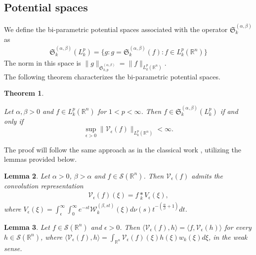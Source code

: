 \documentclass[11pt,a4paper,reqno]{amsproc}
\newtheorem{theorem}{Theorem}[section]
\newtheorem{lemma}[theorem]{Lemma}
\theoremstyle{definition}
\theoremstyle{remark}
\numberwithin{equation}{section}
\begin{document}
\subsection{Potential spaces}We define the bi-parametric potential spaces associated with the operator $\mathfrak{S}_k^{(\alpha, \beta)}$ as
\begin{align*}
    \mathfrak{S}_k^{(\alpha, \beta)}(L_k^p)=\{ g: g=\mathfrak{S}_k^{(\alpha, \beta)}(f) : f\in L_k^p(\mathbb{R}^n)\}
\end{align*}
The norm in this space is  $\|g\|_{\mathfrak{S}_{k,p}^{(\alpha, \beta)}}=\|f\|_{L_k^p(\mathbb{R}^n)}.$\\
The following theorem characterizes the bi-parametric potential spaces. 
\begin{theorem} \label{p.Inversion}
    
     Let $\alpha, \beta>0$ and $f\in L_k^p(\mathbb{R}^n)$ for $1<p<\infty$. Then $f\in \mathfrak{S}_k^{(\alpha, \beta)}(L_k^p) $ if and only if $$\underset{\epsilon>0}{\sup}\|\mathcal{V}_\epsilon (f)\|_{L_k^p(\mathbb{R}^n)} < \infty .$$
\end{theorem}
The proof will follow the same approach as in the classical work \cite{Aliev}, utilizing the lemmas provided below.
\begin{lemma} \label{Lemma-P-C-1}
    Let $ \alpha >0$, $\beta >\alpha$ and $f\in \mathcal{S}(\mathbb{R}^n)$. Then $\mathcal{V}_{\epsilon}(f)$ admits the convolution representation
    \begin{align*}
      \mathcal{V}_{\epsilon}(f)(\xi) = f \underset{k}{\ast} V_{\epsilon}(\xi),
    \end{align*} where $V_{\epsilon}(\xi)= \int_{\epsilon}^\infty \int_0^\infty e^{-st}\mathcal{W}_k^{(\beta, st)}(\xi) d\nu(s)t^{-(\frac{\alpha}{\beta}+1)}dt$.
\end{lemma}
\begin{lemma} \label{Lemma-P-c-2}
    Let $f \in \mathcal{S}(\mathbb{R}^n)$ and $\epsilon >0$. Then $\langle \mathcal{V}_{\epsilon}(f), h \rangle = \langle f, \mathcal{V}_{\epsilon}(h) \rangle$ for every $h\in \mathcal{S}(\mathbb{R}^n)$, where $ \langle \mathcal{V}_{\epsilon}(f), h \rangle= \int_{\mathbb{R}^n} \mathcal{V}_{\epsilon}(f)(\xi)h(\xi)w_k(\xi)d\xi$, in the weak sense.
\end{lemma}
\end{document}
